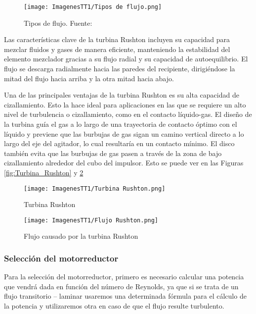 \documentclass[14pt,oneside]{extarticle} %
\begin{document}
\begin{figure}[H]
    \centering
    \texttt{[image: ImagenesTT1/Tipos de flujo.png]}
    \caption{Tipos de flujo. Fuente: \cite{FlujoAgitadores}}
    \label{fig:Tipos_flujo}
\end{figure}

Las características clave de la turbina Rushton incluyen su capacidad para mezclar fluidos y gases de manera eficiente, manteniendo la estabilidad del elemento mezclador gracias a su flujo radial y su capacidad de autoequilibrio. El flujo se descarga radialmente hacia las paredes del recipiente, dirigiéndose la mitad del flujo hacia arriba y la otra mitad hacia abajo.

Una de las principales ventajas de la turbina Rushton es su alta capacidad de cizallamiento. Esto la hace ideal para aplicaciones en las que se requiere un alto nivel de turbulencia o cizallamiento, como en el contacto líquido-gas. El diseño de la turbina guía el gas a lo largo de una trayectoria de contacto óptimo con el líquido y previene que las burbujas de gas sigan un camino vertical directo a lo largo del eje del agitador, lo cual resultaría en un contacto mínimo. El disco también evita que las burbujas de gas pasen a través de la zona de bajo cizallamiento alrededor del cubo del impulsor. Esto se puede ver en las Figuras \ref{fig:Turbina_Rushton} y \ref{fig:Flujo_Rushton}

\begin{figure}[H]
  \centering
  \begin{minipage}{0.3\textwidth}
    \centering
    \texttt{[image: ImagenesTT1/Turbina Rushton.png]}
    \caption{Turbina Rushton}
    \label{fig:Turbina_Rushton}
  \end{minipage}%
  \begin{minipage}{0.3\textwidth}
    \centering
    \texttt{[image: ImagenesTT1/Flujo Rushton.png]}
    \caption{Flujo causado por la turbina Rushton}
    \label{fig:Flujo_Rushton}
  \end{minipage}
\end{figure}

\subsubsection{Selección del motorreductor}

Para la selección del motorreductor, primero es necesario calcular una potencia que vendrá dada en función del número de Reynolds, ya que si se trata de un flujo transitorio – laminar usaremos una determinada fórmula para el cálculo de la potencia y utilizaremos otra en caso de que el flujo resulte turbulento. 
\end{document}
